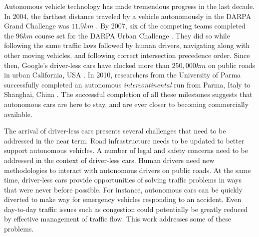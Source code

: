 \documentclass[letterpaper, 10 pt, conference]{ieeeconf}  %
\begin{document}

Autonomous vehicle technology has made tremendous progress in the last decade.
In 2004, the farthest distance traveled by a vehicle autonomously in the DARPA
Grand Challenge was $11.9km$ \cite{cnnGrandChallenge2004}. By 2007, six of the
competing teams completed the $96km$ course set for the DARPA Urban Challenge
\cite{spectrumUrbanChallenge2007}. They did so while following the same traffic
laws followed by human drivers, navigating along with other moving vehicles,
and following correct intersection precedence order. Since then, Google's
driver-less cars have clocked more than $250,000km$ on public roads in urban
California, USA \cite{tedThrun2011}. In 2010, researchers from the University
of Parma successfully completed an autonomous \textit{intercontinental} run
from Parma, Italy to Shanghai, China \cite{cnnVislab2010}. The successful
completion of all these milestones suggests that autonomous cars are here to
stay, and are ever closer to becoming commercially available. 

The arrival of driver-less cars presents several challenges that need to be
addressed in the near term. Road infrastructure needs to be updated to better
support autonomous vehicles. A number of legal and safety concerns need to be
addressed in the context of driver-less cars. Human drivers need new
methodologies to interact with autonomous drivers on public roads. At the same
time, driver-less cars provide opportunities of solving traffic problems in
ways that were never before possible. For instance, autonomous cars can be
quickly diverted to make way for emergency vehicles responding to an accident.
Even day-to-day traffic issues such as congestion could potentially be greatly
reduced by effective management of traffic flow. This work addresses
some of these problems.

\end{document}
